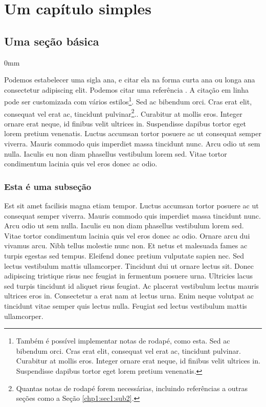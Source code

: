 \documentclass[./main.tex]{subfiles}
\begin{document}
\chapter{Um capítulo simples} \label{chap:1}
\thispagestyle{fancy}

\section{Uma seção básica} \label{chp1:sec1}

\begin{adjustwidth}{\bodytab}{0mm}
\par Podemos estabelecer uma sigla \gls{ana}, e citar ela na forma curta \acrshort{ana} ou longa \acrlong{ana} consectetur adipiscing elit. Podemos citar uma referência \cite{descartes2008discurso}. A citação em linha pode ser customizada com vários estilos\footnote{Também é possível implementar notas de rodapé, como esta. Sed ac bibendum orci. Cras erat elit, consequat vel erat ac, tincidunt pulvinar. Curabitur at mollis eros. Integer ornare erat neque, id finibus velit ultrices in. Suspendisse dapibus tortor eget lorem pretium venenatis.}. Sed ac bibendum orci. Cras erat elit, consequat vel erat ac, tincidunt pulvinar\footnote{Quantas notas de rodapé forem necessárias, incluindo referências a outras seções como a Seção \ref{chp1:sec1:sub2}.}.. Curabitur at mollis eros. Integer ornare erat neque, id finibus velit ultrices in. Suspendisse dapibus tortor eget lorem pretium venenatis. Luctus accumsan tortor posuere ac ut consequat semper viverra. Mauris commodo quis imperdiet massa tincidunt nunc. Arcu odio ut sem nulla. Iaculis eu non diam phasellus vestibulum lorem sed. Vitae tortor condimentum lacinia quis vel eros donec ac odio. 

\subsection{Esta é uma subseção} \label{chp1:sec1:sub1}

\par Est sit amet facilisis magna etiam tempor. Luctus accumsan tortor posuere ac ut consequat semper viverra. Mauris commodo quis imperdiet massa tincidunt nunc. Arcu odio ut sem nulla. Iaculis eu non diam phasellus vestibulum lorem sed. Vitae tortor condimentum lacinia quis vel eros donec ac odio. Ornare arcu dui vivamus arcu. Nibh tellus molestie nunc non. Et netus et malesuada fames ac turpis egestas sed tempus. Eleifend donec pretium vulputate sapien nec. Sed lectus vestibulum mattis ullamcorper. Tincidunt dui ut ornare lectus sit. Donec adipiscing tristique risus nec feugiat in fermentum posuere urna. Ultricies lacus sed turpis tincidunt id aliquet risus feugiat. Ac placerat vestibulum lectus mauris ultrices eros in. Consectetur a erat nam at lectus urna. Enim neque volutpat ac tincidunt vitae semper quis lectus nulla. Feugiat sed lectus vestibulum mattis ullamcorper.


\end{adjustwidth}
\end{document}
